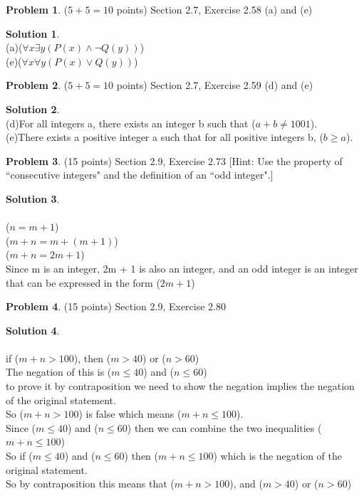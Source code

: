 \documentclass{article}
\theoremstyle{definition}
\newtheorem{problem}{Problem}
\newtheorem*{solution}{Solution}
\begin{document}
\newpage
\begin{problem} ($5+5=10$ points) Section 2.7, Exercise 2.58 (a) and (e)
\end{problem}
\begin{solution} 
  ~\\
  (a)($\forall x \exists y (P(x) \land \neg Q(y))$)
  \\(e)($\forall x \forall y (P(x) \lor Q(y))$)
\end{solution}

\newpage
\begin{problem} ($5+5=10$ points) Section 2.7, Exercise 2.59 (d) and (e)
\end{problem}
\begin{solution} 
  ~\\
  (d)For all integers a, there exists an integer b such that ($a + b \neq 1001$).
  \\(e)There exists a positive integer a such that for all positive integers b, ($b \geq a$).
\end{solution}

\newpage
\begin{problem} (15 points) Section 2.9, Exercise 2.73
[Hint: Use the property of ``consecutive integers" and the definition of an ``odd integer".]
\end{problem}
\begin{solution} 
  ~\\
  \\($ n = m + 1$)
  \\($ m + n = m + (m + 1)$)
  \\($ m + n = 2m + 1$)
  \\Since m is an integer, 2m + 1 is also an integer, and an odd integer is an integer that can be expressed in the form ($2m + 1$)
\end{solution}

\newpage
\begin{problem} (15 points) Section 2.9, Exercise 2.80 
\end{problem}
\begin{solution}
  ~\\
  \\if ($m + n > 100$), then ($m > 40$) or ($n > 60$)
  \\The negation of this is ($m \leq 40$) and ($ n \leq 60$)
  \\to prove it by contraposition we need to show the negation implies the negation of the original statement.
  \\So ($m + n > 100$) is false which means ($m + n \leq 100$).
  \\Since ($m \leq 40$) and ($ n \leq 60$) then we can combine the two inequalities ($m + n \leq 100$)
  \\So if ($m \leq 40$) and ($ n \leq 60$) then ($m + n \leq 100$) which is the negation of the original statement.
  \\So by contraposition this means that ($m + n > 100$), and ($m > 40$) or ($n > 60$)
\end{solution}
\end{document}
